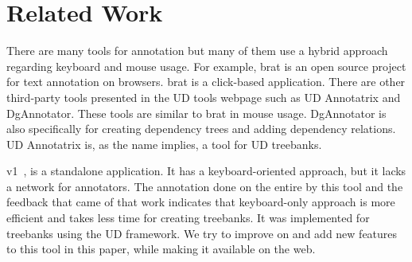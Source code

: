 \section{Related Work}
\label{sec:related}

There are many tools for annotation but many of them use a hybrid approach regarding keyboard and mouse usage.
For example, brat is an open source project for text annotation on browsers.\cite{brat}\cite{UD}
brat is a click-based application.
There are other third-party tools presented in the UD tools webpage such as UD Annotatrix\cite{tyers-etal:2018} and DgAnnotator\cite{dgannotator}.
These tools are similar to brat in mouse usage.
DgAnnotator is also specifically for creating dependency trees and adding dependency relations.
UD Annotatrix is, as the name implies, a tool for UD treebanks.

\boat{} v1~\cite{turk-etal-2019-turkish}, is a standalone application.
It has a keyboard-oriented approach, but it lacks a network for annotators.
The annotation done on the entire \bountreebank{} by this tool and the feedback that came of that work indicates that keyboard-only approach is more efficient and takes less time for creating treebanks.
It was implemented for treebanks using the UD framework.
We try to improve on and add new features to this tool in this paper, while making it available on the web.
